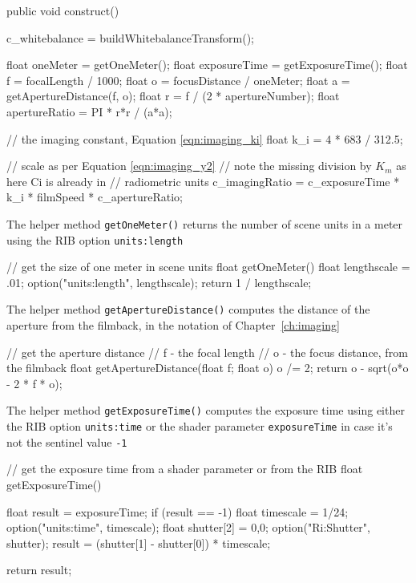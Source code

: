 \begin{rslcode}
public void construct()
{
    c_whitebalance = buildWhitebalanceTransform();

    float oneMeter = getOneMeter();
    float exposureTime = getExposureTime();
    float f = focalLength / 1000;
    float o = focusDistance / oneMeter;
    float a = getApertureDistance(f, o);
    float r = f / (2 * apertureNumber);
    float apertureRatio = PI * r*r / (a*a);

    // the imaging constant, Equation \ref{eqn:imaging_ki}
    float k_i = 4 * 683 / 312.5;

    // scale as per Equation \ref{eqn:imaging_y2}
    // note the missing division by $K_m$ as here Ci is already in
    // radiometric units
    c_imagingRatio = c_exposureTime * k_i * filmSpeed * c_apertureRatio;
}
\end{rslcode}

The helper method \Verb|getOneMeter()| returns the number of scene units in a
meter using the \gls{RIB} option \Verb|units:length|

\begin{rslcode}
// get the size of one meter in scene units
float getOneMeter()
{
    float lengthscale = .01;
    option("units:length", lengthscale);
    return 1 / lengthscale;
}
\end{rslcode}


The helper method \Verb|getApertureDistance()| computes the distance of the
aperture from the filmback, in the notation of Chapter~\ref{ch:imaging}

\begin{rslcode}
// get the aperture distance
// f - the focal length
// o - the focus distance, from the filmback
float getApertureDistance(float f; float o)
{
    o /= 2;
    return o - sqrt(o*o - 2 * f * o);
}
\end{rslcode}


The helper method \Verb|getExposureTime()| computes the exposure time using
either the \gls{RIB} option \Verb|units:time| or the shader parameter
\Verb|exposureTime| in case it's not the sentinel value \Verb|-1|

\begin{rslcode}
// get the exposure time from a shader parameter or from the RIB
float getExposureTime()
{
    float result = exposureTime;
    if (result == -1)
    {
        float timescale = 1/24;
        option("units:time", timescale);
        float shutter[2] = {0,0};
        option("Ri:Shutter", shutter);
        result = (shutter[1] - shutter[0]) * timescale;
    }

    return result;
}
\end{rslcode}


